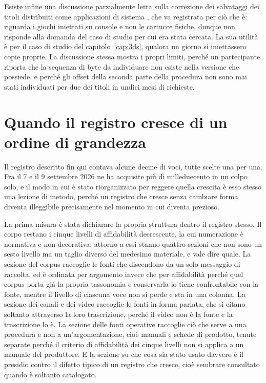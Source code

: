 Esiste infine una discussione parzialmente letta sulla correzione dei salvataggi dei titoli distribuiti come applicazioni di sistema \cite{gbatemp-vc-save}, che va registrata per ciò che è: riguarda i giochi iniettati su console e non le cartucce fisiche, dunque non risponde alla domanda del caso di studio per cui era stata cercata. La sua utilità è per il caso di studio del capitolo~\ref{cap:3ds}, qualora un giorno si iniettassero copie proprie. La discussione stessa mostra i propri limiti, perché un partecipante riporta che la sequenza di byte da individuare non esiste nella versione che possiede, e perché gli offset della seconda parte della procedura non sono mai stati individuati per due dei titoli in undici mesi di richieste.

\section{Quando il registro cresce di un ordine di grandezza}

Il registro descritto fin qui contava alcune decine di voci, tutte scelte una per una. Fra il 7 e il 9 settembre 2026 ne ha acquisite più di milleduecento in un colpo solo, e il modo in cui è stato riorganizzato per reggere quella crescita è esso stesso una lezione di metodo, perché un registro che cresce senza cambiare forma diventa illeggibile precisamente nel momento in cui diventa prezioso.

La prima misura è stata dichiarare la propria struttura dentro il registro stesso. Il corpo restano i cinque livelli di affidabilità decrescente, la cui numerazione è normativa e non decorativa; attorno a essi stanno quattro sezioni che non sono un sesto livello ma un taglio diverso del medesimo materiale, e vale dire quale. La sezione del corpus raccoglie le fonti che discendono da un solo messaggio di raccolta, ed è ordinata per argomento invece che per affidabilità perché quel corpus porta già la propria tassonomia e conservarla lo tiene confrontabile con la fonte, mentre il livello di ciascuna voce non si perde e sta in una colonna. La sezione dei canali e dei video raccoglie le fonti in forma parlata, che si citano soltanto attraverso la loro trascrizione, perché il video non è la fonte e la trascrizione lo è. La sezione delle fonti operative raccoglie ciò che serve a una procedura e non a un'argomentazione, cioè manuali e schede di prodotto, tenute separate perché il criterio di affidabilità dei cinque livelli non si applica a un manuale del produttore. E la sezione su che cosa sia stato usato davvero è il presidio contro il difetto tipico di un registro che cresce, cioè sembrare consultato quando è soltanto catalogato.

